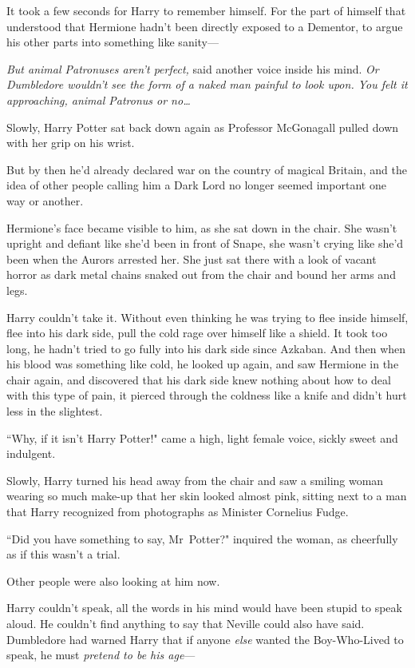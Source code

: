 It took a few seconds for Harry to remember himself. For the part of himself that understood that Hermione hadn't been directly exposed to a Dementor, to argue his other parts into something like sanity—

\emph{But animal Patronuses aren't perfect,} said another voice inside his mind. \emph{Or Dumbledore wouldn't see the form of a naked man painful to look upon. You felt it approaching, animal Patronus or no{\ldots}}

Slowly, Harry Potter sat back down again as Professor McGonagall pulled down with her grip on his wrist.

But by then he'd already declared war on the country of magical Britain, and the idea of other people calling him a Dark Lord no longer seemed important one way or another.

Hermione's face became visible to him, as she sat down in the chair. She wasn't upright and defiant like she'd been in front of Snape, she wasn't crying like she'd been when the Aurors arrested her. She just sat there with a look of vacant horror as dark metal chains snaked out from the chair and bound her arms and legs.

Harry couldn't take it. Without even thinking he was trying to flee inside himself, flee into his dark side, pull the cold rage over himself like a shield. It took too long, he hadn't tried to go fully into his dark side since Azkaban. And then when his blood was something like cold, he looked up again, and saw Hermione in the chair again, and discovered that his dark side knew nothing about how to deal with this type of pain, it pierced through the coldness like a knife and didn't hurt less in the slightest.

``Why, if it isn't Harry Potter!" came a high, light female voice, sickly sweet and indulgent.

Slowly, Harry turned his head away from the chair and saw a smiling woman wearing so much make-up that her skin looked almost pink, sitting next to a man that Harry recognized from photographs as Minister Cornelius Fudge.

``Did you have something to say, Mr~Potter?" inquired the woman, as cheerfully as if this wasn't a trial.

Other people were also looking at him now.

Harry couldn't speak, all the words in his mind would have been stupid to speak aloud. He couldn't find anything to say that Neville could also have said. Dumbledore had warned Harry that if anyone \emph{else} wanted the Boy-Who-Lived to speak, he must \emph{pretend to be his age}—

